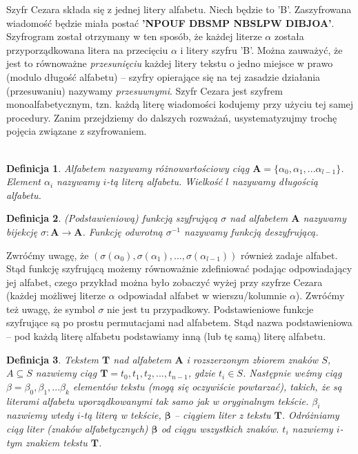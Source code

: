 \documentclass[a4paper]{article}
\theoremstyle{defn}
\newtheorem{defn}{Definicja}[subsection]
\theoremstyle{theorem}
\theoremstyle{lemma}
\theoremstyle{cor}
\theoremstyle{fact}
\begin{document}
Szyfr Cezara składa się z jednej litery alfabetu. Niech będzie to 'B'. Zaszyfrowana wiadomość będzie miała postać \textbf{'NPOUF DBSMP NBSLPW DIBJOA'}. Szyfrogram został otrzymany w ten sposób, że każdej literze \textbf{$\alpha$} została przyporządkowana litera na przecięciu $\alpha$ i litery szyfru 'B'. Można zauważyć, że jest to równoważne \textit{przesunięciu} każdej litery tekstu o jedno miejsce w prawo (modulo długość alfabetu) – szyfry opierające się na tej zasadzie działania (przesuwaniu) nazywamy \textit{przesuwnymi}. Szyfr Cezara jest szyfrem monoalfabetycznym, tzn. każdą literę wiadomości kodujemy przy użyciu tej samej procedury. Zanim przejdziemy do dalszych rozważań, usystematyzujmy trochę pojęcia związane z szyfrowaniem.\\\\
\begin{defn}\label{defn4.1.1}
\textit{Alfabetem} nazywamy różnowartościowy ciąg $\boldsymbol{A} = \{\alpha_0, \alpha_1, ... \alpha_{l-1}\}$. Element $\alpha_i$ nazywamy $i$-tą \textit{literą} alfabetu. Wielkość $l$ nazywamy długością alfabetu.
\end{defn}
\begin{defn}\label{defn4.1.2}
\textit{(Podstawieniową) funkcją szyfrującą} $\sigma$ nad alfabetem $\boldsymbol{A}$ nazywamy bijekcję $\sigma: \boldsymbol{A} \to \boldsymbol{A}$. Funkcję odwrotną $\sigma^{-1}$ nazywamy \textit{funkcją deszyfrującą}.
\end{defn}
Zwróćmy uwagę, że $(\sigma(\alpha_0), \sigma(\alpha_1),...,\sigma(\alpha_{l-1}))$ również zadaje alfabet. Stąd funkcję szyfrującą możemy równoważnie zdefiniować podając odpowiadający jej alfabet, czego przykład można było zobaczyć wyżej przy szyfrze Cezara (każdej możliwej literze $\alpha$ odpowiadał alfabet w wierszu/kolumnie $\alpha$). Zwróćmy też uwagę, że symbol $\sigma$ nie jest tu przypadkowy. Podstawieniowe funkcje szyfrujące są po prostu permutacjami nad alfabetem. Stąd nazwa podstawieniowa – pod każdą literę alfabetu podstawiamy inną (lub tę samą) literę alfabetu.
\begin{defn}\label{defn4.1.3}
\textit{Tekstem} $\boldsymbol{T}$ nad alfabetem $\boldsymbol{A}$ i rozszerzonym zbiorem znaków $S$, $A \subseteq S$ nazwiemy ciąg $\boldsymbol{T} = t_0, t_1, t_2, ..., t_{n-1}$, gdzie $t_i \in S$. Następnie weźmy ciąg $\beta = \beta_0, \beta_1, ... \beta_k$ elementów tekstu (mogą się oczywiście powtarzać), takich, że są literami alfabetu uporządkowanymi tak samo jak w oryginalnym tekście. $\beta_i$ nazwiemy wtedy $i$-tą literą w tekście, $\boldsymbol{\beta}$ – ciągiem liter z tekstu $\boldsymbol{T}$. Odróżniamy ciąg liter (znaków alfabetycznych) $\boldsymbol{\beta}$ od ciągu wszystkich znaków. $t_i$ nazwiemy $i$-tym znakiem tekstu $\boldsymbol{T}$.
\end{defn}
\end{document}
